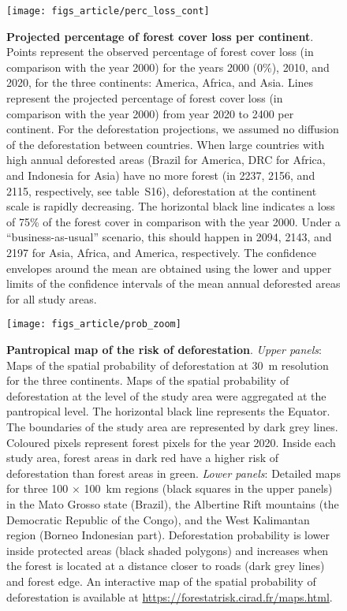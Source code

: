 \documentclass[
  12pt,
]{article}
\begin{document}
\begin{figure}[H]

{\centering \texttt{[image: figs\_article/perc\_loss\_cont]} 

}

\caption{\textbf{Projected percentage of forest cover loss per continent}. Points represent the observed percentage of forest cover loss (in comparison with the year 2000) for the years 2000 (0\%), 2010, and 2020, for the three continents: America, Africa, and Asia. Lines represent the projected percentage of forest cover loss (in comparison with the year 2000) from year 2020 to 2400 per continent. For the deforestation projections, we assumed no diffusion of the deforestation between countries. When large countries with high annual deforested areas (Brazil for America, DRC for Africa, and Indonesia for Asia) have no more forest (in 2237, 2156, and 2115, respectively, see table~S16), deforestation at the continent scale is rapidly decreasing. The horizontal black line indicates a loss of 75\% of the forest cover in comparison with the year 2000. Under a ``business-as-usual'' scenario, this should happen in 2094, 2143, and 2197 for Asia, Africa, and America, respectively. The confidence envelopes around the mean are obtained using the lower and upper limits of the confidence intervals of the mean annual deforested areas for all study areas.}\label{fig:perc-loss}
\end{figure}



\begin{figure}[H]

{\centering \texttt{[image: figs\_article/prob\_zoom]} 

}

\caption{\textbf{Pantropical map of the risk of deforestation}. \emph{Upper panels}: Maps of the spatial probability of deforestation at 30~m resolution for the three continents. Maps of the spatial probability of deforestation at the level of the study area were aggregated at the pantropical level. The horizontal black line represents the Equator. The boundaries of the study area are represented by dark grey lines. Coloured pixels represent forest pixels for the year 2020. Inside each study area, forest areas in dark red have a higher risk of deforestation than forest areas in green. \emph{Lower panels}: Detailed maps for three 100 \(\times\) 100~km regions (black squares in the upper panels) in the Mato Grosso state (Brazil), the Albertine Rift mountains (the Democratic Republic of the Congo), and the West Kalimantan region (Borneo Indonesian part). Deforestation probability is lower inside protected areas (black shaded polygons) and increases when the forest is located at a distance closer to roads (dark grey lines) and forest edge. An interactive map of the spatial probability of deforestation is available at \url{https://forestatrisk.cirad.fr/maps.html}.}\label{fig:prob}
\end{figure}
\end{document}
